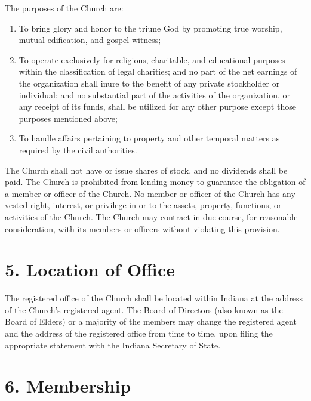 \documentclass[
]{book}
\providecommand{\tightlist}{%
  \setlength{\itemsep}{0pt}\setlength{\parskip}{0pt}}
\begin{document}
The purposes of the Church are:

\begin{enumerate}
\def\labelenumi{\alph{enumi}.}
\tightlist
\item
  To bring glory and honor to the triune God by promoting true worship, mutual edification, and gospel witness;
\item
  To operate exclusively for religious, charitable, and educational purposes within the classifica­tion of legal charities; and no part of the net earnings of the organization shall inure to the benefit of any private stockholder or individual; and no substantial part of the activities of the organization, or any receipt of its funds, shall be utilized for any other purpose except those purposes mentioned above;
\item
  To handle affairs pertaining to property and other temporal matters as required by the civil authorities.
\end{enumerate}

The Church shall not have or issue shares of stock, and no dividends shall be paid. The Church is prohibited from lending money to guarantee the obligation of a member or officer of the Church. No member or officer of the Church has any vested right, interest, or privilege in or to the assets, property, functions, or activities of the Church. The Church may contract in due course, for reasonable consideration, with its members or officers without violating this provision.

\hypertarget{location-of-office}{%
\section{5. Location of Office}\label{location-of-office}}

The registered office of the Church shall be located within Indiana at the address of the Church's registered agent. The Board of Directors (also known as the Board of Elders) or a majority of the members may change the registered agent and the address of the registered office from time to time, upon filing the appropriate statement with the Indiana Secretary of State.

\hypertarget{membership}{%
\section{6. Membership}\label{membership}}
\end{document}
